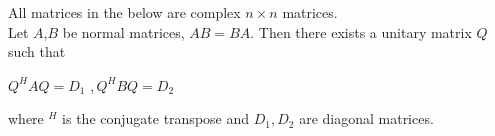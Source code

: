 \documentclass[12pt]{article}
\begin{document}
All matrices in the below are complex $n\times n$ matrices.
\\Let $A$,$B$ be normal matrices, $AB=BA$. Then there exists a unitary matrix $Q$ such that \\
\begin{center}
$Q^HAQ = D_1$ ,\,$Q^HBQ=D_2$
\end{center}
where $^H$ is the conjugate transpose and $D_1, D_2$ are diagonal matrices.
\end{document}
